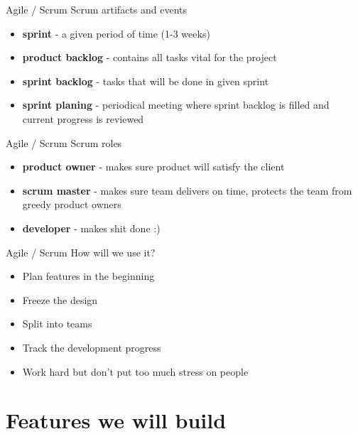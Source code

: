 \documentclass{beamer}
\begin{document}
	\begin{frame}{Agile / Scrum}
		Scrum artifacts and events
		\begin{itemize}
			\item \textbf{sprint} - a given period of time (1-3 weeks)
			\item \textbf{product backlog} - contains all tasks vital for the project
			\item \textbf{sprint backlog} - tasks that will be done in given sprint
			\item \textbf{sprint planing} - periodical meeting where sprint backlog is filled and current progress is reviewed
		\end{itemize}
	\end{frame}

	\begin{frame}{Agile / Scrum}
		Scrum roles
		\begin{itemize}
			\item \textbf{product owner} - makes sure product will satisfy the client
			\item \textbf{scrum master} - makes sure team delivers on time, protects the team from greedy product owners
			\item \textbf{developer} - makes shit done :)
		\end{itemize}
	\end{frame}

	\begin{frame}{Agile / Scrum}
		How will we use it?
		\begin{itemize}
			\item Plan features in the beginning
			\item Freeze the design
			\item Split into teams
			\item Track the development progress
			\item Work hard but don't put too much stress on people
		\end{itemize}
	\end{frame}
	
	\section{Features we will build}
\end{document}
